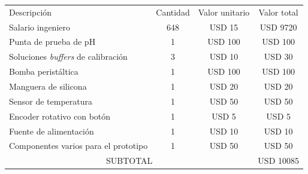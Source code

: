 \documentclass[
11pt, %
codirector, %
]{charter}
\begin{document}
\begin{table}[htpb]
\centering
\begin{tabularx}{\linewidth}{@{}|X|c|r|r|@{}}
\hline
\rowcolor[HTML]{C0C0C0} 
\multicolumn{4}{|c|}{\cellcolor[HTML]{C0C0C0}COSTOS DIRECTOS} \\ \hline
\rowcolor[HTML]{C0C0C0} 
Descripción &
  \multicolumn{1}{c|}{\cellcolor[HTML]{C0C0C0}Cantidad} &
  \multicolumn{1}{c|}{\cellcolor[HTML]{C0C0C0}Valor unitario} &
  \multicolumn{1}{c|}{\cellcolor[HTML]{C0C0C0}Valor total} \\ \hline
 
 Salario ingeniero &
  \multicolumn{1}{c|}{ 648 } &
  \multicolumn{1}{c|}{ USD 15 } &
  \multicolumn{1}{c|}{ USD 9720 } \\ \hline
  
 Punta de prueba de pH &
  \multicolumn{1}{c|}{ 1 } &
  \multicolumn{1}{c|}{ USD 100 } &
  \multicolumn{1}{c|}{ USD 100 } \\ \hline
  
 Soluciones \textit{buffers} de calibración &
  \multicolumn{1}{c|}{ 3 } &
  \multicolumn{1}{c|}{ USD 10 } &
  \multicolumn{1}{c|}{ USD 30 } \\ \hline
  
 Bomba peristáltica &
  \multicolumn{1}{c|}{ 1 } &
  \multicolumn{1}{c|}{ USD 100 } &
  \multicolumn{1}{c|}{ USD 100 } \\ \hline
  
 Manguera de silicona &
  \multicolumn{1}{c|}{ 1 } &
  \multicolumn{1}{c|}{ USD 20 } &
  \multicolumn{1}{c|}{ USD 20 } \\ \hline

 Sensor de temperatura &
  \multicolumn{1}{c|}{ 1 } &
  \multicolumn{1}{c|}{ USD 50 } &
  \multicolumn{1}{c|}{ USD 50 } \\ \hline
  
 Encoder rotativo con botón &
  \multicolumn{1}{c|}{ 1 } &
  \multicolumn{1}{c|}{ USD 5 } &
  \multicolumn{1}{c|}{ USD 5 } \\ \hline
  
 Fuente de alimentación &
  \multicolumn{1}{c|}{ 1 } &
  \multicolumn{1}{c|}{ USD 10 } &
  \multicolumn{1}{c|}{ USD 10 } \\ \hline   

 Componentes varios para el prototipo &
  \multicolumn{1}{c|}{ 1 } &
  \multicolumn{1}{c|}{ USD 50 } &
  \multicolumn{1}{c|}{ USD 50 } \\ \hline  
  
\multicolumn{3}{|c|}{SUBTOTAL} &
  \multicolumn{1}{c|}{ USD 10085 } \\ \hline
  

\end{tabularx}
\end{table}
\end{document}
